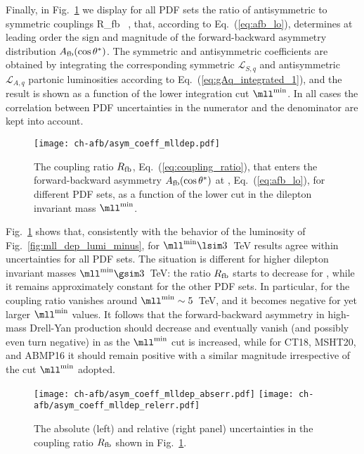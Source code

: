 Finally, in Fig.~\ref{fig:asym_coeff_mlldep} we display for all
PDF sets the
ratio of antisymmetric to symmetric couplings
\be
\label{eq:coupling_ratio}
R_{\rm fb}\equiv {} \, ,
\ee
that, according to
Eq.~(\ref{eq:afb_lo}), determines at leading order
the sign and magnitude
of the forward-backward asymmetry distribution $A_{\rm fb}(\cos\theta^*)$.
%
The symmetric and antisymmetric coefficients are obtained by integrating
the corresponding symmetric $\mathcal{L}_{S,q}$ and antisymmetric
$\mathcal{L}_{A,q}$ partonic luminosities according to
Eq.~(\ref{eq:gAq_integrated_1}), and the result is shown as a function of the lower integration cut $\mll^{\rm min}$.
%
In all cases the correlation between PDF uncertainties in the numerator and
the denominator are kept into account.

\begin{figure}[!t]
 \centering
 \texttt{[image: ch-afb/asym\_coeff\_mlldep.pdf]}
 \caption{The coupling ratio $R_{\rm fb}$,
   Eq.~(\ref{eq:coupling_ratio}),
   that enters the forward-backward asymmetry $A_{\rm
     fb}(\cos\theta^*)$ at \lo,  Eq.~(\ref{eq:afb_lo}), for different PDF
   sets, as  a function of the lower cut in the dilepton
   invariant mass $\mll^{\rm min}$.
 }    
 \label{fig:asym_coeff_mlldep}
\end{figure}

Fig.~\ref{fig:asym_coeff_mlldep} shows that, consistently
with the behavior of the luminosity of
Fig.~\ref{fig:mll_dep_lumi_minus},  for $\mll^{{\rm
    min}}\lsim 3$~TeV results agree within uncertainties for all PDF
sets.
%
The situation is different for higher dilepton invariant masses $\mll^{{\rm min}}\gsim 3$~TeV:
the ratio $R_{\rm fb}$ starts to decrease for , while it
remains approximately  constant 
for the other  PDF sets. In particular, for  the coupling ratio
vanishes around $\mll^{{\rm min}}\sim5$~TeV, and it becomes negative
for yet larger   $\mll^{{\rm min}}$ values.
It follows that the forward-backward
asymmetry in high-mass Drell-Yan production should decrease  and
eventually vanish (and possibly even turn negative)
in  as the $\mll^{{\rm min}}$ cut is increased,
while for CT18, MSHT20, and ABMP16 it should remain positive
with a similar magnitude irrespective of the cut  $\mll^{{\rm min}}$ adopted.

\begin{figure}[!t]
 \centering
 \texttt{[image: ch-afb/asym\_coeff\_mlldep\_abserr.pdf]}
 \texttt{[image: ch-afb/asym\_coeff\_mlldep\_relerr.pdf]}
 \caption{The absolute (left) and relative (right panel) uncertainties
   in the coupling ratio $R_{\rm fb}$ shown in Fig.~\ref{fig:asym_coeff_mlldep}.
 }    
 \label{fig:asym_coeff_mlldep_err}
\end{figure}

